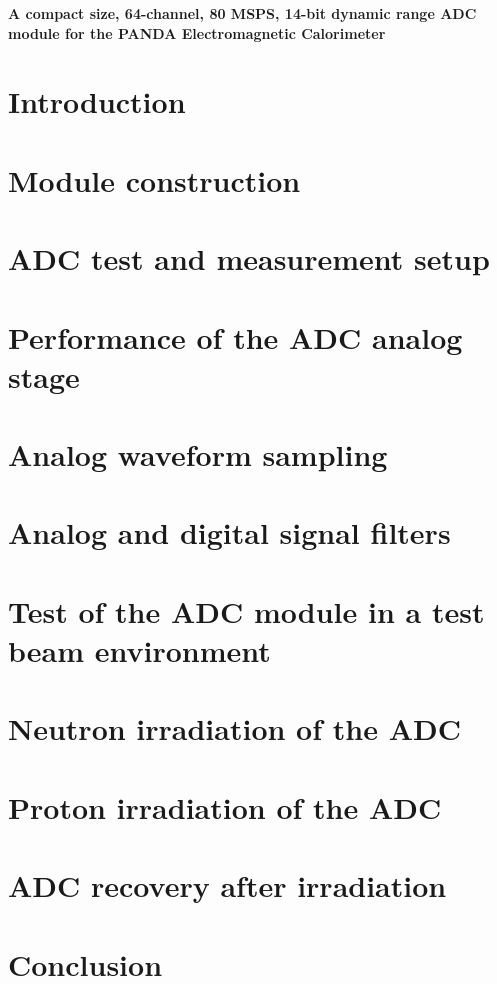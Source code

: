 \documentclass[12pt,a4paper]{article}
\begin{document}
\begin{center}
{\bfseries \Large A compact size, 64-channel, 80 MSPS, 14-bit dynamic range ADC module for the PANDA Electromagnetic Calorimeter
}
\end{center}
\section{Introduction}
\section{Module construction}
\section{ADC test and measurement setup}
\section{Performance of the ADC analog stage}
\section{Analog waveform sampling}
\section{Analog and digital signal filters}
\section{Test of the ADC module in a test beam environment}
\section{Neutron irradiation of the ADC}
\section{Proton irradiation of the ADC}
\section{ADC recovery after irradiation}
\section{Conclusion}
\end{document}
